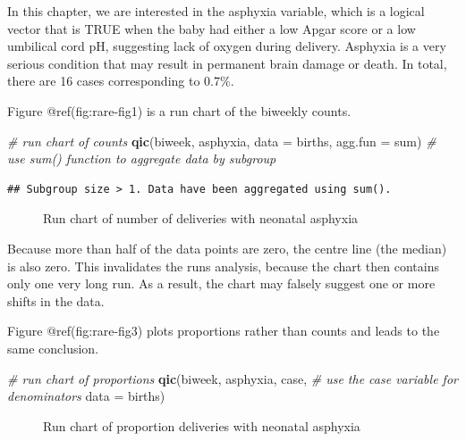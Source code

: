 \documentclass[
]{book}
\makeatletter
\newenvironment{Shaded}{\begin{snugshade}}{\end{snugshade}}
\newcommand{\AttributeTok}[1]{\textcolor[rgb]{0.13,0.29,0.53}{#1}}
\newcommand{\CommentTok}[1]{\textcolor[rgb]{0.56,0.35,0.01}{\textit{#1}}}
\newcommand{\FunctionTok}[1]{\textcolor[rgb]{0.13,0.29,0.53}{\textbf{#1}}}
\newcommand{\NormalTok}[1]{#1}
\newcommand{\StringTok}[1]{\textcolor[rgb]{0.31,0.60,0.02}{#1}}
\newcommand*\pandocbounded[1]{%
  \sbox\pandoc@box{#1}%
  \Gscale@div\@tempa{\textheight}{\dimexpr\ht\pandoc@box+\dp\pandoc@box\relax}%
  \Gscale@div\@tempb{\linewidth}{\wd\pandoc@box}%
  \ifdim\@tempb\p@<\@tempa\p@\let\@tempa\@tempb\fi%
  \ifdim\@tempa\p@<\p@\scalebox{\@tempa}{\usebox\pandoc@box}%
  \else\usebox{\pandoc@box}%
  \fi%
}
\makeatother
\begin{document}
In this chapter, we are interested in the asphyxia variable, which is a
logical vector that is TRUE when the baby had either a low Apgar score
or a low umbilical cord pH, suggesting lack of oxygen during delivery.
Asphyxia is a very serious condition that may result in permanent brain
damage or death. In total, there are 16 cases corresponding to 0.7\%.

Figure @ref(fig:rare-fig1) is a run chart of the biweekly counts.

\begin{Shaded}
\begin{Highlighting}[]
\CommentTok{\# run chart of counts}
\FunctionTok{qic}\NormalTok{(biweek, asphyxia, }
    \AttributeTok{data    =}\NormalTok{ births, }
    \AttributeTok{agg.fun =} \StringTok{\textquotesingle{}sum\textquotesingle{}}\NormalTok{)  }\CommentTok{\# use sum() function to aggregate data by subgroup}
\end{Highlighting}
\end{Shaded}

\begin{verbatim}
## Subgroup size > 1. Data have been aggregated using sum().
\end{verbatim}

\begin{figure}
\centering
\pandocbounded{}
\caption{Run chart of number of deliveries with neonatal asphyxia}
\end{figure}

Because more than half of the data points are zero, the centre line (the
median) is also zero. This invalidates the runs analysis, because the
chart then contains only one very long run. As a result, the chart may
falsely suggest one or more shifts in the data.

Figure @ref(fig:rare-fig3) plots proportions rather than counts and
leads to the same conclusion.

\begin{Shaded}
\begin{Highlighting}[]
\CommentTok{\# run chart of proportions}
\FunctionTok{qic}\NormalTok{(biweek, asphyxia, case,  }\CommentTok{\# use the case variable for denominators}
    \AttributeTok{data =}\NormalTok{ births)}
\end{Highlighting}
\end{Shaded}

\begin{figure}
\centering
\pandocbounded{}
\caption{Run chart of proportion deliveries with neonatal asphyxia}
\end{figure}
\end{document}
